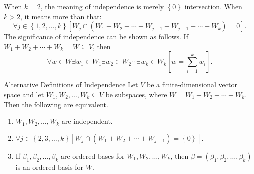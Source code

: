 \documentclass[math_245.tex]{subfiles}
\begin{document}
    \begin{remark}
        When $k=2$, the meaning of independence is merely $\left\lbrace 0 \right\rbrace$ intersection. When $k>2$, it means more than that:
        \begin{equation*}
            \forall j\in \left\lbrace 1, 2, \ldots, k \right\rbrace \left[ W_j\cap \left( W_1+W_2+\cdots+W_{j-1}+W_{j+1}+\cdots+W_k \right) = 0 \right].
        \end{equation*}
        The significance of independence can be shown as follows. If $W_1+W_2+\cdots+W_k=W\subseteq V$, then
        \begin{equation*}
            \forall w\in W\exists w_1\in W_1\exists w_2\in W_2\cdots\exists w_k\in W_k \left[ w = \sum^{k}_{i=1} w_i \right].
        \end{equation*}
    \end{remark}

    \begin{lemma}{Alternative Definitions of Independence}
        Let $V$ be a finite-dimensional vector space and let $W_1, W_2, \ldots, W_k\subseteq V$ be subspaces, where $W = W_1+W_2+\cdots+W_k$. Then the following are equivalent.
        \begin{enumerate}
            \item $W_1, W_2, \ldots, W_k$ are independent.
            \item $\forall j\in \left\lbrace 2, 3, \ldots, k \right\rbrace \left[ W_j\cap \left( W_1+W_2+\cdots+W_{j-1} \right) = \left\lbrace 0 \right\rbrace  \right]$.
            \item If $\beta_1, \beta_2, \ldots, \beta_k$ are ordered bases for $W_1, W_2, \ldots, W_k$, then $\beta = \left( \beta_1, \beta_2, \ldots, \beta_k \right)$ is an ordered basis for $W$.
        \end{enumerate}
    \end{lemma}
\end{document}
